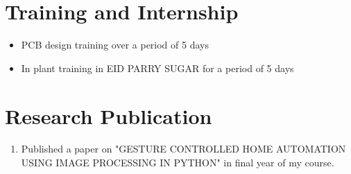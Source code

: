 \documentclass[a4paper,12pt,line]{article}
\begin{document}
	\hspace{-1.9cm}
	\newpage%
	\hspace*{-19mm}
		
		
	
	\section*{{\color{magenta}Training and Internship}}
	\begin{itemize}
		\item PCB design training over a period of 5 days
		\item In plant training in EID PARRY SUGAR for a period of 5 days
		
	\end{itemize}
		
	
	\section*{{\color{magenta}Research Publication}}
	
	\begin{enumerate}
		\item Published a paper on "GESTURE CONTROLLED HOME AUTOMATION USING IMAGE PROCESSING IN PYTHON" in final year of my course.
	\end{enumerate}
	
\end{document}
